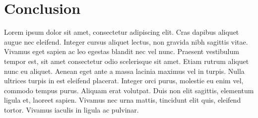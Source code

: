 \documentclass[runningheads]{llncs}
\begin{document}
\section{Conclusion}
Lorem ipsum dolor sit amet, consectetur adipiscing elit. Cras dapibus aliquet augue nec eleifend. Integer cursus aliquet lectus, non gravida nibh sagittis vitae. Vivamus eget sapien ac leo egestas blandit nec vel nunc. Praesent vestibulum tempor est, sit amet consectetur odio scelerisque sit amet. Etiam rutrum aliquet nunc eu aliquet. Aenean eget ante a massa lacinia maximus vel in turpis. Nulla ultrices turpis in est eleifend placerat. Integer orci purus, molestie eu enim vel, commodo tempus purus. Aliquam erat volutpat. Duis non elit sagittis, elementum ligula et, laoreet sapien. Vivamus nec urna mattis, tincidunt elit quis, eleifend tortor. Vivamus iaculis in ligula ac pulvinar.



\end{document}
